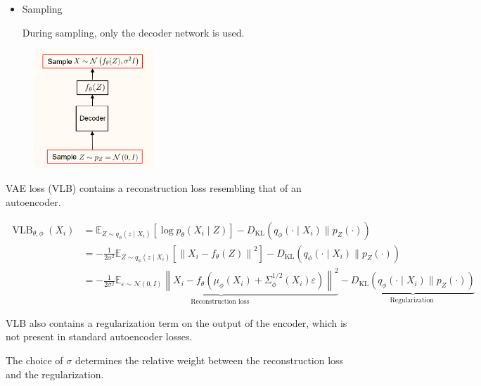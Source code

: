 \documentclass{report}
\begin{document}
\begin{concept}
    \par\noindent\textcolor{gray}{\hdashrule{\textwidth}{0.4pt}{1pt 2pt}}

    \begin{itemize}
        \item
        Sampling

        During sampling, only the decoder network is used.
    \end{itemize}

    \begin{figure}[H]
        \centering
        \includegraphics[width=0.4\textwidth]{.././assets/11.7.png}
    \end{figure}
\end{concept}

\begin{concept}
    VAE loss (VLB) contains a reconstruction loss resembling that of an autoencoder.

    $$
    \begin{aligned}
    \operatorname{VLB}_{\theta, \phi}\left(X_{i}\right) & =\mathbb{E}_{Z \sim q_{\phi}\left(z \mid X_{i}\right)}\left[\log p_{\theta}\left(X_{i} \mid Z\right)\right]-D_{\mathrm{KL}}\left(q_{\phi}\left(\cdot \mid X_{i}\right) \| p_{Z}(\cdot)\right) \\
    & =-\frac{1}{2 \sigma^{2}} \mathbb{E}_{Z \sim q_{\phi}\left(z \mid X_{i}\right)}\left[\left\|X_{i}-f_{\theta}(Z)\right\|^{2}\right]-D_{\mathrm{KL}}\left(q_{\phi}\left(\cdot \mid X_{i}\right) \| p_{Z}(\cdot)\right) \\
    & =-\underbrace{\frac{1}{2 \sigma^{2}} \mathbb{E}_{\varepsilon \sim \mathcal{N}(0, I)}\left\|X_{i}-f_{\theta}\left(\mu_{\phi}\left(X_{i}\right)+\Sigma_{\phi}^{1 / 2}\left(X_{i}\right) \varepsilon\right)\right\|^{2}}_{\text {Reconstruction loss }}-\underbrace{D_{\mathrm{KL}}\left(q_{\phi}\left(\cdot \mid X_{i}\right) \| p_{Z}(\cdot)\right)}_{\text {Regularization }}
    \end{aligned}
    $$

    VLB also contains a regularization term on the output of the encoder, which is not present in standard autoencoder losses.

    The choice of $\sigma$ determines the relative weight between the reconstruction loss and the regularization.
\end{concept}
\end{document}
